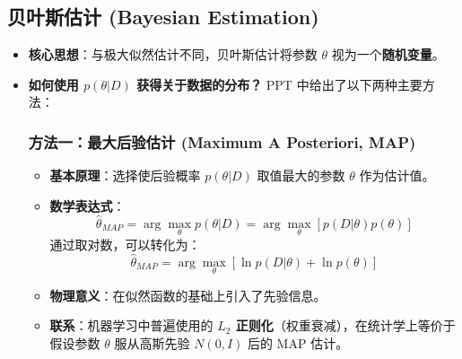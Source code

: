 \documentclass[a4paper, 11pt]{ctexart}
\begin{document}
\subsection{贝叶斯估计 (Bayesian Estimation)}
\begin{itemize}
    \item \textbf{核心思想}：与极大似然估计不同，贝叶斯估计将参数 $\theta$ 视为一个\textbf{随机变量}。
    \item \textbf{如何使用 $p(\theta|D)$ 获得关于数据的分布？}
    PPT 中给出了以下两种主要方法：

    \subsubsection*{方法一：最大后验估计 (Maximum A Posteriori, MAP)}
    \begin{itemize}
        \item \textbf{基本原理}：选择使后验概率 $p(\theta|D)$ 取值最大的参数 $\theta$ 作为估计值。
        \item \textbf{数学表达式}：
        \begin{equation}
            \hat{\theta}_{MAP} = \arg \max_{\theta} p(\theta|D) = \arg \max_{\theta} [ p(D|\theta) p(\theta) ]
        \end{equation}
        通过取对数，可以转化为：
        \begin{equation}
            \hat{\theta}_{MAP} = \arg \max_{\theta} [ \ln p(D|\theta) + \ln p(\theta) ]
        \end{equation}
        \item \textbf{物理意义}：在似然函数的基础上引入了先验信息。
        \item \textbf{联系}：机器学习中普遍使用的 \textbf{$L_2$ 正则化}（权重衰减），在统计学上等价于假设参数 $\theta$ 服从高斯先验 $N(0, I)$ 后的 MAP 估计。
    \end{itemize}


\end{itemize}
\end{document}
